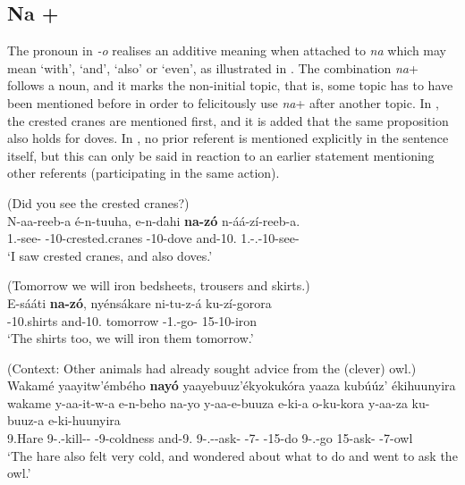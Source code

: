 \documentclass[output=paper]{langscibook}
\begin{document}
\subsection{Na + \PRO{}}
\label{bkm:Ref135664306}
The pronoun in \textit{-o} realises an additive meaning when attached to \textit{na} which may mean ‘with’, ‘and’, ‘also’ or ‘even’, as illustrated in . The combination \textit{na}+\PRO{} follows a noun, and it marks the non-initial topic, that is, some topic has to have been mentioned before in order to felicitously use \textit{na}+\PRO{} after another topic. In , the crested cranes are mentioned first, and it is added that the same proposition also holds for doves. In , no prior referent is mentioned explicitly in the sentence itself, but this can only be said in reaction to an earlier statement mentioning other referents (participating in the same action).

\ea
\label{bkm:Ref111487876}
(Did you see the crested cranes?)\\
\gll
N-aa-reeb-a  é-n-tuuha,  e-n-dahi  \textbf{na-zó}    n-áá-zí-reeb-a. \\
1\SG{}.\SM{}-see-\FV{}  \AUG{}-{}10-crested.cranes  \AUG{}-10-dove  and-10.\PRO{}   1\SG{}.\SM{}-\N{}.\PST{}-10\OM{}-see-\FV{} \\
\glt
`I saw crested cranes, and also doves.’\\

\z

\ea
\label{bkm:Ref135665621}
(Tomorrow we will iron bedsheets, trousers and skirts.)\\
\gll
E-sááti  \textbf{na-zó},  nyénsákare  ni-tu-z-á  ku-zí-gorora\\
\AUG{}-10.shirts  and-10.\PRO{}  tomorrow  \IPFV{}-1\PL{}.\SM{}-go-\FV{}  15-10\OM{}-iron\\
\glt
`The shirts too, we will iron them tomorrow.’\\


\z

\ea
\label{bkm:Ref111487879}
(Context: Other animals had already sought advice from the (clever) owl.) \\
Wakamé yaayitw’émbého \textbf{nayó} yaayebuuz’ékyokukóra yaaza kubúúz’ ékihuunyira\\
\gll
wakame  y-aa-it-w-a  e-n-beho  na-yo  y-aa-e-buuza  e-ki-a  o-ku-kora  y-aa-za  ku-buuz-a  e-ki-huunyira\\
9.Hare  9\SM{}-\N{}.\PST{}-kill-\PASS{}-\FV{}  \AUG{}-9-coldness  and-9.\PRO{}  9\SM{}-\N{}.\PST{}-\REFL{}-ask-\FV{}  \AUG{}-7-\CONN{}  \AUG{}-15-do  9\SM{}-\N{}.\PST{}-go  15-ask-\FV{}  \AUG{}-7-owl\\
\glt
‘The hare also felt very cold, and wondered about what to do and went to ask the owl.’\\
\end{document}
